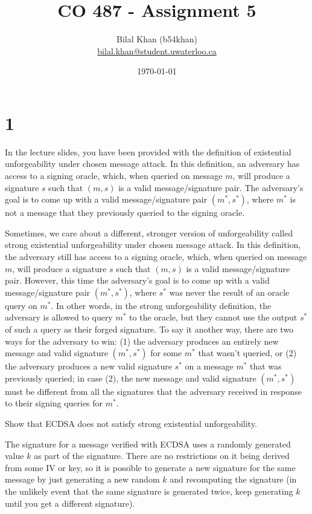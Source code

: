 \documentclass[11pt]{article}
\title{CO 487 - Assignment 5}
\author{Bilal Khan (b54khan)\\
\href{mailto:bilal.khan@student.uwaterloo.ca}{bilal.khan@student.uwaterloo.ca}}
\date{\today}
\begin{document}
\maketitle

\tableofcontents

\section{1}

In the lecture slides, you have been provided with the definition of existential unforgeability under chosen message attack. In this definition, an adversary has access to a signing oracle, which, when queried on message $m$, will produce a signature $s$ such that $(m, s)$ is a valid message/signature pair. The adversary's goal is to come up with a valid message/signature pair $(m^*, s^*)$, where $m^*$ is not a message that they previously queried to the signing oracle.

Sometimes, we care about a different, stronger version of unforgeability called strong existential unforgeability under chosen message attack. In this definition, the adversary still has access to a signing oracle, which, when queried on message $m$, will produce a signature $s$ such that $(m, s)$ is a valid message/signature pair. However, this time the adversary's goal is to come up with a valid message/signature pair $(m^*, s^*)$, where $s^*$ was never the result of an oracle query on $m^*$.
In other words, in the strong unforgeability definition, the adversary is allowed to query $m^*$ to the oracle, but they cannot use the output $s^*$ of such a query as their forged signature. To say it another way, there are two ways for the adversary to win: (1) the adversary produces an entirely new message and valid signature $(m^*, s^*)$ for some $m^*$ that wasn't queried, or (2) the adversary produces a new valid signature $s^*$ on a message $m^*$ that was previously queried; in case (2), the new message and valid signature $(m^*, s^*)$ must be different from all the signatures that the adversary received in response to their signing queries for $m^*$.

Show that ECDSA does not satisfy strong existential unforgeability.

The signature for a message verified with ECDSA uses a randomly generated value $k$ as part of the signature. There are no restrictions on it being derived from some IV or key, so it is possible to generate a new signature for the same message by just generating a new random $k$ and recomputing the signature (in the unlikely event that the same signature is generated twice, keep generating $k$ until you get a different signature). 
\end{document}
